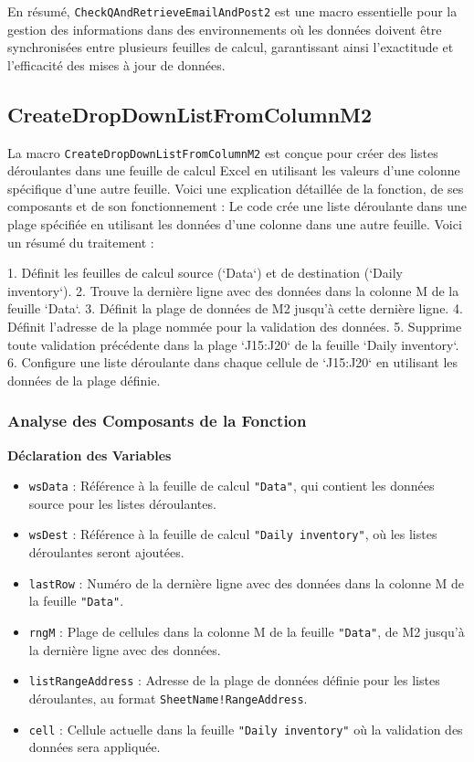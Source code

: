 \documentclass[a4paper, oneside, 12pt, final]{extreport}
\begin{document}
En résumé, \texttt{CheckQAndRetrieveEmailAndPost2} est une macro essentielle pour la gestion des informations dans des environnements où les données doivent être synchronisées entre plusieurs feuilles de calcul, garantissant ainsi l'exactitude et l'efficacité des mises à jour de données.
\subsection{CreateDropDownListFromColumnM2}

La macro \texttt{CreateDropDownListFromColumnM2} est conçue pour créer des listes déroulantes dans une feuille de calcul Excel en utilisant les valeurs d'une colonne spécifique d'une autre feuille. Voici une explication détaillée de la fonction, de ses composants et de son fonctionnement :
Le code crée une liste déroulante dans une plage spécifiée en utilisant les données d'une colonne dans une autre feuille. Voici un résumé du traitement :

1. Définit les feuilles de calcul source (`Data`) et de destination (`Daily inventory`).
2. Trouve la dernière ligne avec des données dans la colonne M de la feuille `Data`.
3. Définit la plage de données de M2 jusqu'à cette dernière ligne.
4. Définit l'adresse de la plage nommée pour la validation des données.
5. Supprime toute validation précédente dans la plage `J15:J20` de la feuille `Daily inventory`.
6. Configure une liste déroulante dans chaque cellule de `J15:J20` en utilisant les données de la plage définie.

\subsubsection{Analyse des Composants de la Fonction}

\textbf{Déclaration des Variables}

\begin{itemize}
    \item \texttt{wsData} : Référence à la feuille de calcul \texttt{"Data"}, qui contient les données source pour les listes déroulantes.
    \item \texttt{wsDest} : Référence à la feuille de calcul \texttt{"Daily inventory"}, où les listes déroulantes seront ajoutées.
    \item \texttt{lastRow} : Numéro de la dernière ligne avec des données dans la colonne M de la feuille \texttt{"Data"}.
    \item \texttt{rngM} : Plage de cellules dans la colonne M de la feuille \texttt{"Data"}, de M2 jusqu'à la dernière ligne avec des données.
    \item \texttt{listRangeAddress} : Adresse de la plage de données définie pour les listes déroulantes, au format \texttt{SheetName!RangeAddress}.
    \item \texttt{cell} : Cellule actuelle dans la feuille \texttt{"Daily inventory"} où la validation des données sera appliquée.
\end{itemize}
\end{document}
